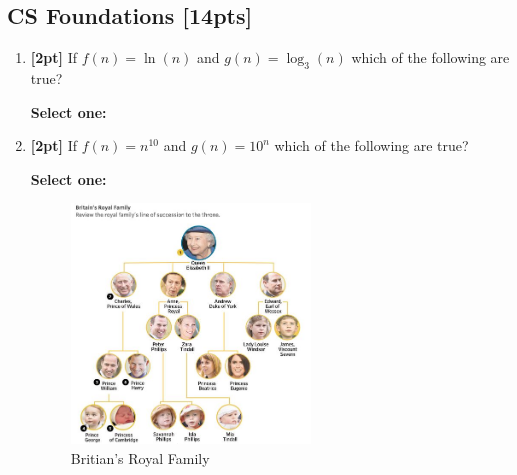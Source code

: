 \documentclass[12pt]{article}
\renewcommand{\circle}{\tikz\draw[black] (0,0) circle (1ex);}
\begin{document}
\subsection{CS Foundations [14pts]}
\begin{enumerate}
    \item \textbf{[2pt]} If $f(n)=\ln(n)$ and $g(n)=\log_3(n)$ which of the following are true?

    \textbf{Select one:}



    \item \textbf{[2pt]} If $f(n)=n^{10}$ and $g(n)=10^n$ which of the following are true?

    \textbf{Select one:}



    \begin{figure}[H]
        \centering
        \includegraphics[width=0.6\textwidth]{BritiansRoyalFamily.jpg}
        \caption{Britian's Royal Family}
        \label{fig:family}
    \end{figure}
    

\end{enumerate}
\end{document}
